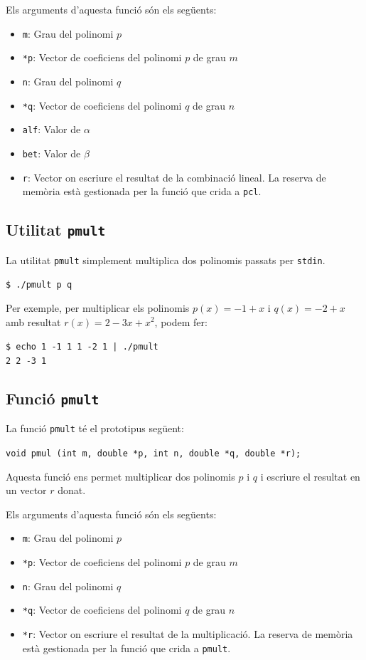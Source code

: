 \documentclass[12pt,twoside,a4paper]{article}
\newcommand{\bash}[1]{\begin{tcolorbox}\texttt{\$ #1}\end{tcolorbox}}
\newcommand{\fn}[2]{\begin{tcolorbox}[enhanced,colback=white,colframe=gray!50!white,attach boxed title to top center={yshift=-3mm,yshifttext=-1mm},title={Funció \texttt{#1}},boxed title style={size=small,colframe=black},colbacktitle=white,coltitle=black]\texttt{#2}\end{tcolorbox}}
\begin{document}
Els arguments d'aquesta funció són els següents:
\begin{itemize}
    \item \texttt{m}: Grau del polinomi $p$
    \item \texttt{*p}: Vector de coeficiens del polinomi $p$ de grau $m$
    \item \texttt{n}: Grau del polinomi $q$
    \item \texttt{*q}: Vector de coeficiens del polinomi $q$ de grau $n$
    \item \texttt{alf}: Valor de $\alpha$
    \item \texttt{bet}: Valor de $\beta$
    \item \texttt{r}: Vector on escriure el resultat de la combinació lineal. La reserva de memòria està gestionada per la funció que crida a \texttt{pcl}.
\end{itemize}

\newpage

\subsection{Utilitat \texttt{pmult}}
La utilitat \texttt{pmult} simplement multiplica dos polinomis passats per \texttt{stdin}.
\bash{./pmult p q}

Per exemple, per multiplicar els polinomis $p(x) = -1 + x$ i $q(x) = -2 + x$ amb resultat $r(x) = 2 - 3x + x^2$, podem fer:
\bash{echo 1 -1 1 1 -2 1 | ./pmult\\2 2 -3 1}

\subsection{Funció \texttt{pmult}}
La funció \texttt{pmult} té el prototipus següent:

\fn{pmult}{void pmul (int m, double *p, int n, double *q, double *r);}

Aquesta funció ens permet multiplicar dos polinomis $p$ i $q$ i escriure el resultat en un vector $r$ donat.

Els arguments d'aquesta funció són els següents:
\begin{itemize}
    \item \texttt{m}: Grau del polinomi $p$
    \item \texttt{*p}: Vector de coeficiens del polinomi $p$ de grau $m$
    \item \texttt{n}: Grau del polinomi $q$
    \item \texttt{*q}: Vector de coeficiens del polinomi $q$ de grau $n$
    \item \texttt{*r}: Vector on escriure el resultat de la multiplicació. La reserva de memòria està gestionada per la funció que crida a \texttt{pmult}.
\end{itemize}
\end{document}

